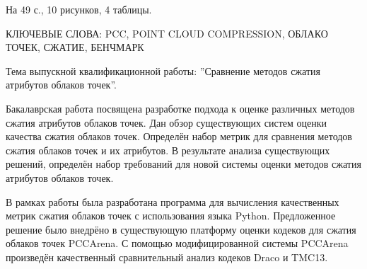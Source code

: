 На 49 с., 10 рисунков, 4 таблицы.

КЛЮЧЕВЫЕ СЛОВА: PCC, POINT CLOUD COMPRESSION, ОБЛАКО ТОЧЕК, СЖАТИЕ, БЕНЧМАРК

Тема выпускной квалификационной работы: ''Сравнение методов сжатия атрибутов облаков точек''.

Бакалаврская работа посвящена разработке подхода к оценке различных методов
сжатия атрибутов облаков точек. Дан обзор существующих систем оценки качества
сжатия облаков точек. Определён набор метрик для сравнения методов сжатия
облаков точек и их атрибутов. В результате анализа существующих решений,
определён набор требований для новой системы оценки методов сжатия атрибутов
облаков точек.

В рамках работы была разработана программа для вычисления качественных метрик
сжатия облаков точек с использования языка Python. Предложенное решение было
внедрёно в существующую платформу оценки кодеков для сжатия облаков точек
PCCArena. С помощью модифицированной системы PCCArena произведён качественный
сравнительный анализ кодеков Draco и TMC13.
